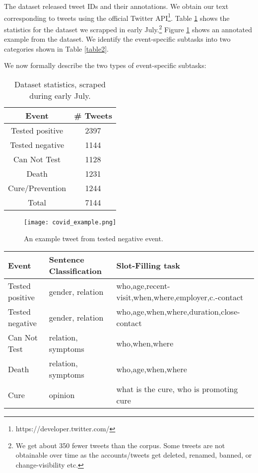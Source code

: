 \documentclass[11pt,a4paper]{article}
\begin{document}
The dataset released tweet IDs and their annotations. We obtain our text corresponding to tweets using the official Twitter API\footnote{https://developer.twitter.com/}. Table \ref{Table1:} shows the statistics for the dataset we scrapped in early July.\footnote{We get about 350 fewer tweets than the corpus. Some tweets are not obtainable over time as the accounts/tweets get deleted, renamed, banned, or change-visibility etc.} Figure
\ref{fig-dataset_example} shows an annotated example from the dataset. We identify the event-specific subtasks into two categories shown in Table \ref{table2}.

We now formally describe the two types of event-specific subtasks:

\begin{table}
 \begin{center}
  \begin{tabular}{c | c } 
   \hline
   \textbf{Event} & \textbf{\# Tweets} \\ [0.5ex] 
   \hline
   Tested positive & 2397 \\ 
   Tested negative & 1144 \\
   Can Not Test & 1128 \\
   Death & 1231 \\
   Cure/Prevention & 1244 \\
   \hline
   Total & 7144 \\
   \hline
  \end{tabular}
  \caption{\label{Table1:} Dataset statistics, scraped during early July.
  }
 \end{center}
\end{table}


\begin{figure}
    \centering
    \texttt{[image: covid\_example.png]}
    \caption{An example tweet from tested negative event.}
    \label{fig-dataset_example}
\end{figure}


\begin{table*}[!htb]
  \centering

   \begin{tabular}{p{2.4cm}|p{3.80cm}| p{8.50cm}}

   \textbf{Event} & \textbf{Sentence Classification} & \textbf{Slot-Filling task} \\
   \hline
    Tested positive & gender, relation & who,age,recent-visit,when,where,employer,c.-contact \\
    Tested negative & gender, relation & who,age,when,where,duration,close-contact\\
    Can Not Test & relation, symptoms & who,when,where \\
    Death & relation, symptoms & who,age,when,where\\
    Cure & opinion & what is the cure, who is promoting cure \\

  \end{tabular}
  \caption{The proposed event-specific subtasks split into two subtask types: slot-filling and sentence classification}
  \label{table2}
\end{table*}
\end{document}
